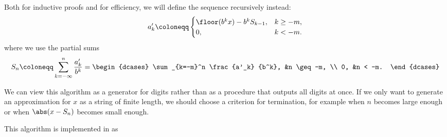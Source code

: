 \begin{algorithm}
\begin{thmenum}
     Both for inductive proofs and for efficiency, we will define the sequence recursively instead:
    \begin{equation}\label{eq:alg:real_number_radix_expansion/recursive}
      a_k' \coloneqq \begin{cases}
        \floor(b^k x) - b^k S_{k - 1}, &k \geq -m, \\
        0,                             &k < -m.
      \end{cases}
    \end{equation}
    where we use the partial sums
    \begin{equation*}
      S_n
      \coloneqq
      \sum_{k=-\infty}^n \frac {a'_k} {b^k}
      =
      \begin{dcases}
        \sum_{k=-m}^n \frac {a'_k} {b^k}, &n \geq -m, \\
        0,                                &n < -m.
      \end{dcases}
    \end{equation*}
  \end{thmenum}
\end{algorithm}
\begin{comments}
  \item We can view this algorithm as a generator for digits rather than as a procedure that outputs all digits at once. If we only want to generate an approximation for \( x \) as a string of finite length, we should choose a criterion for termination, for example when \( n \) becomes large enough or when \( \abs(x - S_n) \) becomes small enough.

  \item This algorithm is implemented in \cite{notebook:code} as
  \begin{CodeRefDisplay}
  \end{CodeRefDisplay}
\end{comments}
